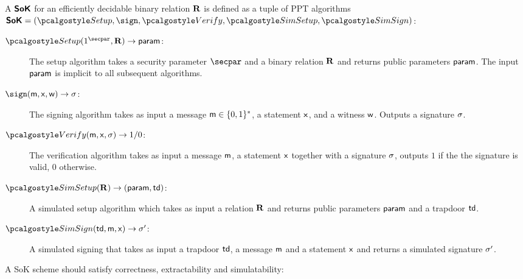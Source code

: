 \label{sec:sok}
A $\bm{\mathsf{SoK}}$ for an efficiently decidable binary relation $\mathbf{R}$ is defined as a tuple of PPT algorithms $\SoK = (\signsetup,  \sign, \allowbreak \verify,  \simsetup, \simsign)$:

\begin{description}
    \item[$\signsetup(1^\secpar, \REL) \rightarrow  \param$:]
	The setup algorithm takes a security parameter $\secpar$ and a binary relation $\mathbf{R}$
	and returns public parameters $ \mathsf{param}$.  The input $ \mathsf{param}$ is implicit to all subsequent algorithms. 

    \item[$\sign(\mesage, \inp, \wit)  \rightarrow \signature$:]
The signing algorithm takes as input a message $ \mathsf{m} \in \{0,1\}^{*}$, 
a statement $\mathsf{x}$, and a witness $\mathsf{w}$.
	Outputs a signature $\mathsf{\sigma}$.

    \item[$\verify(\mesage, \inp, \signature) \rightarrow 1/ 0$:]
The verification algorithm takes as input 
 a message $\mathsf{m}$,  a statement $\mathsf{x}$ 
 together with a signature $\mathsf{\sigma}$,
	outputs $1$ if the the signature is valid, $0$ otherwise.
	
    \item[$\simsetup(\REL) \rightarrow (\param, \td)$:]
    	A simulated setup algorithm which takes as input a relation $\mathbf{R}$ and returns public parameters $\mathsf{param}$ and a trapdoor $\mathsf{td}$. 
    	
   \item[$\simsign(\td, \mesage, \inp) \rightarrow \signature'$:]
   	A simulated signing  that takes as input  a trapdoor $\mathsf{td}$, a message $\mathsf{m}$ and a statement $\mathsf{x}$ and returns a simulated signature $\mathsf{\sigma}'$.
\end{description}
 
A SoK scheme should satisfy correctness, extractability and simulatability:
   
